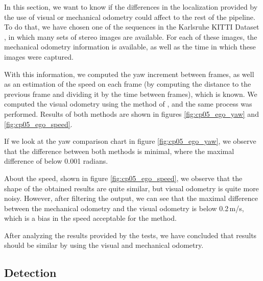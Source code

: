 In this section, we want to know if the differences in the localization provided by the use of visual or mechanical odometry could affect to the rest of the pipeline. To do that, we have chosen one of the sequences in the Karlsruhe KITTI Dataset \citep{geiger2013vision}, in which many sets of stereo images are available. For each of these images, the mechanical odometry information is available, as well as the time in which these images were captured.

With this information, we computed the yaw increment between frames, as well as an estimation of the speed on each frame (by computing the distance to the previous frame and dividing it by the time between frames), which is known. We computed the visual odometry using the method of \cite{geiger2011stereoscan}, and the same process was performed. Results of both methods are shown in figures \ref{fig:cp05_ego_yaw} and \ref{fig:cp05_ego_speed}.

If we look at the yaw comparison chart in figure \ref{fig:cp05_ego_yaw}, we observe that the difference between both methods is minimal, where the maximal difference of below 0.001 radians.

About the speed, shown in figure \ref{fig:cp05_ego_speed}, we observe that the shape of the obtained results are quite similar, but visual odometry is quite more noisy. However, after filtering the output, we can see that the maximal difference between the mechanical odometry and the visual odometry is below 0.2\,m/s, which is a bias in the speed acceptable for the method.

After analyzing the results provided by the tests, we have concluded that results should be similar by using the visual and mechanical odometry.

\subsection{Detection}\label{ch:chapter05_02_03}

